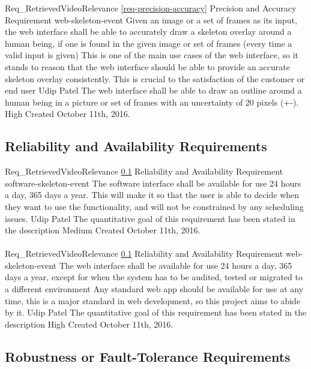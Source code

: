 \documentclass{scrreprt}
\begin{document}
\requirement
{Req_RetrievedVideoRelevance}
{\ref{req-precision-accuracy} Precision and Accuracy Requirement}
{web-skeleton-event}
{Given an image or a set of frames as its input, the web interface shall be able to accurately draw a skeleton overlay around a human being, if one is found in the given image or set of frames (every time a valid input is given)}
{This is one of the main use cases of the web interface, so it stands to reason that the web interface should be able to provide an accurate skeleton overlay consistently. This is crucial to the satisfaction of the customer or end user }
{Udip Patel}
{The web interface shall be able to draw an outline around a human being in a picture or set of frames with an uncertainty of 20 pixels (+-).}
{High}
{Created October 11th, 2016.}

\subsection{Reliability and Availability Requirements}
\label{req-reliability-availability}
\requirement
{Req_RetrievedVideoRelevance}
{\ref{req-reliability-availability} Reliability and Availability Requirement}
{software-skeleton-event}
{The software interface shall be available for use 24 hours a day, 365 days a year.}
{This will make it so that the user is able to decide when they want to use the functionality, and will not be constrained by any scheduling issues.}
{Udip Patel}
{The quantitative goal of this requirement has been stated in the description}
{Medium}
{Created October 11th, 2016.}
\\ \\

\requirement
{Req_RetrievedVideoRelevance}
{\ref{req-reliability-availability} Reliability and Availability Requirement}
{web-skeleton-event}
{The web interface shall be available for use 24 hours a day, 365 days a year, except for when the system has to be audited, tested or migrated to a different environment}
{Any standard web app should be available for use at any time, this is a major standard in web development, so this project aims to abide by it.}
{Udip Patel}
{The quantitative goal of this requirement has been stated in the description}
{High}
{Created October 11th, 2016.}

\subsection{Robustness or Fault-Tolerance Requirements}
\end{document}
